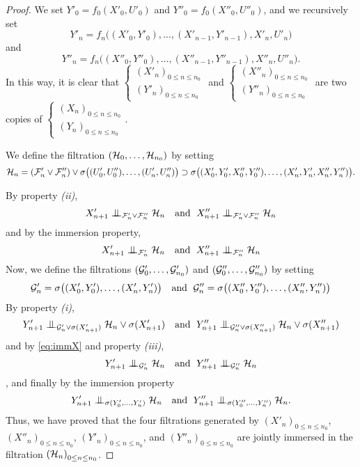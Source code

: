 \documentclass[12pt,a4paper]{article}
\begin{document}
\begin{proof}
We set $Y'_0 = f_0(X'_0, U'_0)$ and $Y''_0 = f_0(X''_0, U''_0)$, and we 
recursively set 
$$
Y'_n = f_n\bigl((X'_0,Y'_0), \ldots, (X'_{n-1}, Y'_{n-1}), X'_n, U'_n\bigr)
$$
and 
$$
Y''_n = f_n\bigl((X''_0,Y''_0), \ldots, (X''_{n-1}, Y''_{n-1}), X''_n, U''_n\bigr).
$$
In this way, it is clear that $\left\{\begin{smallmatrix} {(X'_n)}_{0 \leq n \leq n_0} \\ 
{(Y'_n)}_{0 \leq n \leq n_0}
\end{smallmatrix}\right.$ and 
$\left\{\begin{smallmatrix} {(X''_n)}_{0 \leq n \leq n_0} \\ 
{(Y''_n)}_{0 \leq n \leq n_0}
\end{smallmatrix}\right.$
are two copies of 
$\left\{\begin{smallmatrix} {(X_n)}_{0 \leq n \leq n_0} \\ 
{(Y_n)}_{0 \leq n \leq n_0}
\end{smallmatrix}\right.$.

We define the filtration $(\mathcal{H}_0, \ldots, \mathcal{H}_{n_0})$ by setting 
$$
\mathcal{H}_n = (\mathcal{F}'_n \vee \mathcal{F}''_n) \vee \sigma\bigl((U'_0,U''_0), \ldots, (U'_n, U''_n) \bigr) 
\supset  \sigma\bigl((X'_0,Y'_0,X''_0, Y''_0), \ldots, (X'_n,Y'_n,X''_n, Y''_n) \bigr).
$$

By property {\it(ii)}, 
$$
X'_{n+1} \indep_{\FF'_n\vee\FF''_n} \HH_n 
\quad \text{and }\;
X''_{n+1} \indep_{\FF'_n\vee\FF''_n} \HH_n 
$$
and by the immersion property, 
\begin{equation}\label{eq:immX}
X'_{n+1} \indep_{\FF'_n} \HH_n 
\quad \text{and }\;
X''_{n+1} \indep_{\FF''_n} \HH_n 
\end{equation}
Now, we define the filtrations  $(\mathcal{G}'_0, \ldots, \mathcal{G}'_{n_0})$ 
and  $(\mathcal{G}''_0, \ldots, \mathcal{G}''_{n_0})$ by setting 
$$
\mathcal{G}'_n = \sigma\bigl((X'_0,Y'_0), \ldots, (X'_n, Y'_n)\bigr) 
\quad \text{and }\;
\mathcal{G}''_n = \sigma\bigl((X''_0,Y''_0), \ldots, (X''_n, Y''_n)\bigr) 
$$
By property {\it(i)}, 
$$
Y'_{n+1} \indep_{\GG'_n \vee \sigma(X'_{n+1})} \HH_n \vee \sigma(X'_{n+1})
\quad \text{and }\;
Y''_{n+1} \indep_{\GG''_n \vee \sigma(X''_{n+1})} \HH_n \vee \sigma(X''_{n+1})
$$
and by \eqref{eq:immX} and property {\it(iii)},
$$
Y'_{n+1} \indep_{\GG'_n} \HH_n 
\quad \text{and }\;
Y''_{n+1} \indep_{\GG''_n} \HH_n
$$, 
and finally by the immersion property 
$$
Y'_{n+1} \indep_{\sigma(Y'_0, \ldots, Y'_n)} \HH_n 
\quad \text{and }\;
Y''_{n+1} \indep_{\sigma(Y''_0, \ldots, Y''_n)} \HH_n.
$$
Thus, we have proved that the four filtrations generated by 
${(X'_n)}_{0 \leq n \leq n_0}$, ${(X''_n)}_{0 \leq n \leq n_0}$, 
${(Y'_n)}_{0 \leq n \leq n_0}$, and ${(Y''_n)}_{0 \leq n \leq n_0}$ 
are jointly immersed in the filtration ${(\mathcal{H}_n)}_{0 \leq n \leq n_0}$.
\end{proof}
\end{document}
